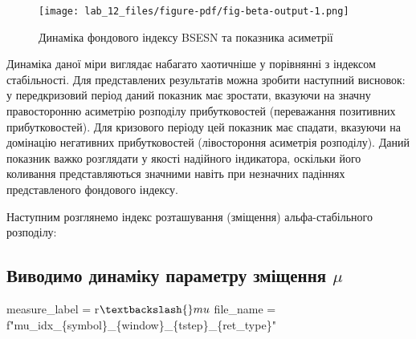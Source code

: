 \documentclass[
  letterpaper,
]{report}
\newenvironment{Shaded}{\begin{snugshade}}{\end{snugshade}}
\newcommand{\NormalTok}[1]{\textcolor[rgb]{0.00,0.23,0.31}{#1}}
\newcommand{\OperatorTok}[1]{\textcolor[rgb]{0.37,0.37,0.37}{#1}}
\newcommand{\SpecialCharTok}[1]{\textcolor[rgb]{0.37,0.37,0.37}{#1}}
\newcommand{\SpecialStringTok}[1]{\textcolor[rgb]{0.13,0.47,0.30}{#1}}
\newcommand{\VerbatimStringTok}[1]{\textcolor[rgb]{0.13,0.47,0.30}{#1}}
\begin{document}
\begin{figure}[H]

{\centering \texttt{[image: lab\_12\_files/figure-pdf/fig-beta-output-1.png]}

}

\caption{\label{fig-beta}Динаміка фондового індексу BSESN та показника
асиметрії}

\end{figure}

Динаміка даної міри виглядає набагато хаотичніше у порівнянні з індексом
стабільності. Для представлених результатів можна зробити наступний
висновок: у передкризовий період даний показник має зростати, вказуючи
на значну правосторонню асиметрію розподілу прибутковостей (переважання
позитивних прибутковостей). Для кризового періоду цей показник має
спадати, вказуючи на домінацію негативних прибутковостей (лівостороння
асиметрія розподілу). Даний показник важко розглядати у якості надійного
індикатора, оскільки його коливання представляються значними навіть при
незначних падіннях представленого фондового індексу.

Наступним розглянемо індекс розташування (зміщення) альфа-стабільного
розподілу:

\hypertarget{ux432ux438ux432ux43eux434ux438ux43cux43e-ux434ux438ux43dux430ux43cux456ux43aux443-ux43fux430ux440ux430ux43cux435ux442ux440ux443-ux437ux43cux456ux449ux435ux43dux43dux44f-mu}{%
\subsection{\texorpdfstring{Виводимо динаміку параметру зміщення
\(\mu\)}{Виводимо динаміку параметру зміщення \textbackslash mu}}\label{ux432ux438ux432ux43eux434ux438ux43cux43e-ux434ux438ux43dux430ux43cux456ux43aux443-ux43fux430ux440ux430ux43cux435ux442ux440ux443-ux437ux43cux456ux449ux435ux43dux43dux44f-mu}}

\begin{Shaded}
\begin{Highlighting}[]
\NormalTok{measure\_label }\OperatorTok{=} \VerbatimStringTok{r\textquotesingle{}$\textbackslash{}mu$\textquotesingle{}}
\NormalTok{file\_name }\OperatorTok{=} \SpecialStringTok{f"mu\_idx\_}\SpecialCharTok{\{}\NormalTok{symbol}\SpecialCharTok{\}}\SpecialStringTok{\_}\SpecialCharTok{\{}\NormalTok{window}\SpecialCharTok{\}}\SpecialStringTok{\_}\SpecialCharTok{\{}\NormalTok{tstep}\SpecialCharTok{\}}\SpecialStringTok{\_}\SpecialCharTok{\{}\NormalTok{ret\_type}\SpecialCharTok{\}}\SpecialStringTok{"}
\end{Highlighting}
\end{Shaded}
\end{document}

